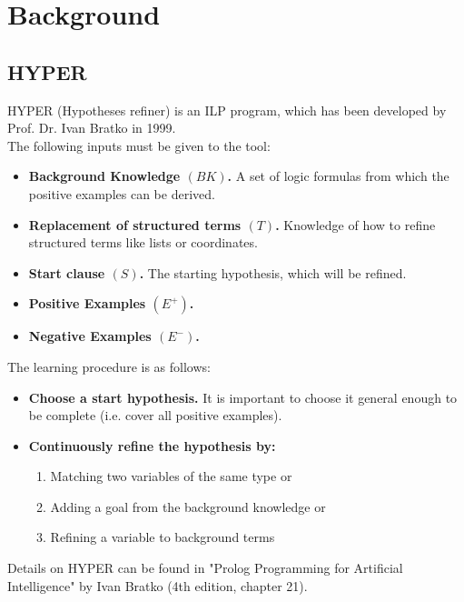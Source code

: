 \section{Background}\label{sec:back}

\subsection{HYPER}
HYPER (Hypotheses refiner) is an ILP program, which has been developed by Prof. Dr. Ivan Bratko in 1999.\\
The following inputs must be given to the tool:
\begin{itemize}
    \item \textbf{Background Knowledge \((BK)\).} A set of logic formulas from which the positive examples can be derived.
    \item \textbf{Replacement of structured terms \((T)\).} Knowledge of how to refine structured terms like lists or coordinates.
    \item \textbf{Start clause \((S)\).} The starting hypothesis, which will be refined. 
    \item \textbf{Positive Examples \((E^+)\).}
    \item \textbf{Negative Examples \((E^-)\).}
\end{itemize}
The learning procedure is as follows:
\begin{itemize}
    \item \textbf{Choose a start hypothesis.} It is important to choose it general enough to be complete (i.e. cover all positive examples).
    \item \textbf{Continuously refine the hypothesis by:} 
	\begin{enumerate}
	\item Matching two variables of the same type or
	\item Adding a goal from the background knowledge or
	\item Refining a variable to background terms
	\end{enumerate}
\end{itemize}
Details on HYPER can be found in "Prolog Programming for Artificial Intelligence" by Ivan Bratko (4th edition, chapter 21).
